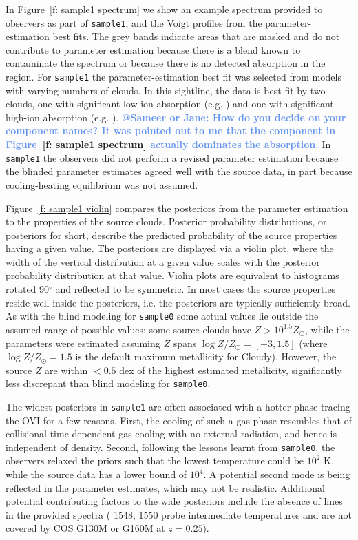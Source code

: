 \documentclass[fleqn,usenatbib]{mnras}
\makeatletter
\newcommand{\atsameer}[1]{\textcolor{CornflowerBlue}{\textbf{@Sameer or Jane: #1}}}
\makeatother
\begin{document}
In Figure~\ref{f: sample1 spectrum} we show an example spectrum provided to observers as part of \texttt{sample1}, and the Voigt profiles from the parameter-estimation best fits.
The grey bands indicate areas that are masked and do not contribute to parameter estimation because there is a blend known to contaminate the spectrum or because there is no detected absorption in the region.
For \texttt{sample1} the parameter-estimation best fit was selected from models with varying numbers of clouds.
In this sightline, the data is best fit by two clouds, one with significant low-ion absorption (e.g. )  and one with significant high-ion absorption (e.g. ).
\atsameer{How do you decide on your component names? It was pointed out to me that the \ion{O}{VI} component in Figure~\ref{f: sample1 spectrum} actually dominates the \ion{C}{II} absorption.}
In \texttt{sample1} the observers did not perform a revised parameter estimation because the blinded parameter estimates agreed well with the source data, in part because cooling-heating equilibrium was not assumed.

Figure~\ref{f: sample1 violin} compares the posteriors from the parameter estimation to the properties of the source clouds.
Posterior probability distributions, or posteriors for short, describe the predicted probability of the source properties having a given value.
The posteriors are displayed via a violin plot,
where the width of the vertical distribution at a given value scales with the posterior probability distribution at that value.
Violin plots are equivalent to histograms rotated 90$^\circ$ and reflected to be symmetric.
In most cases the source properties reside well inside the posteriors, i.e. the posteriors are typically sufficiently broad.
As with the blind modeling for \texttt{sample0} some actual values lie outside the assumed range of possible values: 
some source clouds have $Z > 10^{1.5} Z_\odot$, while the parameters were estimated assuming $Z$ spans $\log Z/Z_\odot = [-3, 1.5]$ (where $\log Z/Z_\odot = 1.5$ is the default maximum metallicity for Cloudy).
However, the source $Z$ are within $< 0.5$ dex of the highest estimated metallicity, significantly less discrepant than blind modeling for \texttt{sample0}.

The widest posteriors in \texttt{sample1} are often associated with a hotter phase tracing the OVI for a few reasons.
First, the cooling of such a gas phase resembles that of collisional time-dependent gas cooling with no external radiation, and hence is independent of density.
Second, following the lessons learnt from \texttt{sample0}, the observers relaxed the priors such that the lowest temperature could be $10^2$ K, while the source data has a lower bound of $10^4$.
A potential second mode is being reflected in the parameter estimates, which may not be realistic. 
Additional potential contributing factors to the wide posteriors include the absence of  lines in the provided spectra ( 1548, 1550 probe intermediate temperatures and are not covered by COS G130M or G160M at $z=0.25$).
\end{document}
